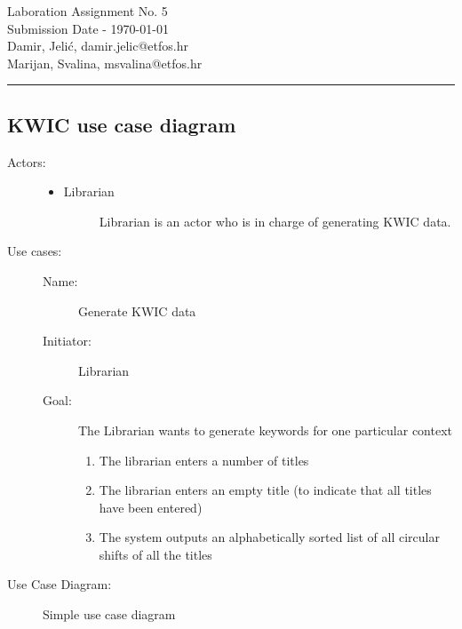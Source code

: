 \documentclass[11pt,a4paper]{article}
\begin{document}
\large
Laboration Assignment No. 5\\
Submission Date - \yyyymmdddate \today \\
Damir, Jelić, damir.jelic@etfos.hr \\
Marijan, Svalina, msvalina@etfos.hr
\\
\rule{\linewidth}{0.1mm}
\setcounter{section}{5}
\subsection{KWIC use case diagram}
\begin{description}
    \item[Actors:] \hfil
    \begin{itemize}
    \item
        Librarian
        \begin{description}
            \item[] Librarian is an actor who is in charge of generating KWIC data.
        \end{description}
    \end{itemize}

    \item[Use cases:] \hfil
        \begin{description}
            \item[Name:] Generate KWIC data
            \item[Initiator:] Librarian
            \item[Goal:]The Librarian wants to generate keywords for one particular context
                 \begin{enumerate}
                    \item The librarian enters a number of titles
                    \item The librarian enters an empty title 
                    (to indicate that all titles have been entered) 
                    \item The system outputs an alphabetically sorted list 
                    of all circular shifts of all the titles
                 \end{enumerate}
        \end{description}
        \item[Use Case Diagram:] \hfil
\end{description}
     \begin{figure}[htb]
         \begin{center}
             \setlength\fboxsep{0pt}
             \caption{Simple use case diagram}
             \label{fig:class_diag}
        \end{center}
    \end{figure}
\end{document}
